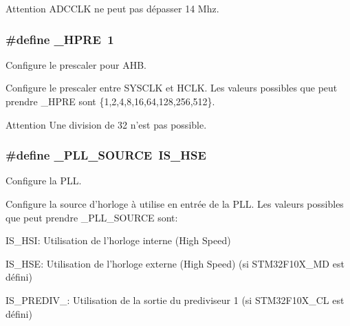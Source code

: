 \begin{DoxyAttention}{Attention}
A\+D\+C\+C\+L\+K ne peut pas dépasser 14 Mhz. 
\end{DoxyAttention}
\hypertarget{group__conf___c_l_o_c_k_ga3d81cc398f3d6af2ad0de7bdcb9ea161}{
\subsubsection[{\+\_\+\+H\+P\+R\+E}]{\setlength{\rightskip}{0pt plus 5cm}\#define \+\_\+\+H\+P\+R\+E~1}}\label{group__conf___c_l_o_c_k_ga3d81cc398f3d6af2ad0de7bdcb9ea161}


Configure le prescaler pour A\+H\+B. 

Configure le prescaler entre S\+Y\+S\+C\+L\+K et H\+C\+L\+K. Les valeurs possibles que peut prendre \+\_\+\+H\+P\+R\+E sont \{1,2,4,8,16,64,128,256,512\}. \begin{DoxyAttention}{Attention}
Une division de 32 n'est pas possible. 
\end{DoxyAttention}
\hypertarget{group__conf___c_l_o_c_k_ga51dccf37cec784bd3f5230a1e94d9dfa}{
\subsubsection[{\+\_\+\+P\+L\+L\+\_\+\+S\+O\+U\+R\+C\+E}]{\setlength{\rightskip}{0pt plus 5cm}\#define \+\_\+\+P\+L\+L\+\_\+\+S\+O\+U\+R\+C\+E~{\bf I\+S\+\_\+\+H\+S\+E}}}\label{group__conf___c_l_o_c_k_ga51dccf37cec784bd3f5230a1e94d9dfa}


Configure la P\+L\+L. 

Configure la source d'horloge à utilise en entrée de la P\+L\+L. Les valeurs possibles que peut prendre \+\_\+\+P\+L\+L\+\_\+\+S\+O\+U\+R\+C\+E sont\+:
\begin{DoxyItemize}
\item I\+S\+\_\+\+H\+S\+I\+: Utilisation de l'horloge interne (High Speed)
\item I\+S\+\_\+\+H\+S\+E\+: Utilisation de l'horloge externe (High Speed) (si S\+T\+M32\+F10\+X\+\_\+\+M\+D est défini)
\item I\+S\+\_\+\+P\+R\+E\+D\+I\+V\+\_\+: Utilisation de la sortie du prediviseur 1 (si S\+T\+M32\+F10\+X\+\_\+\+C\+L est défini)
\end{DoxyItemize}

